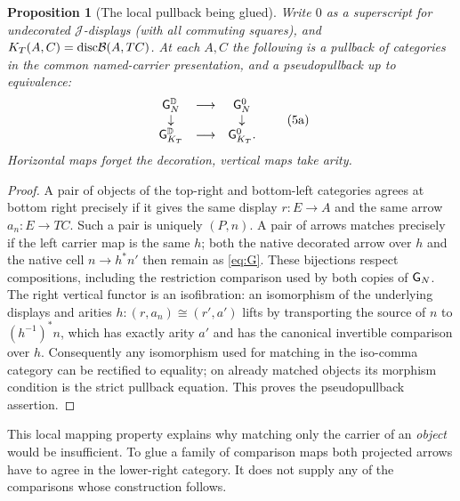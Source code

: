 \documentclass[11pt]{article}
\newtheorem{proposition}[theorem]{Proposition}
\theoremstyle{definition}\newtheorem{definition}[theorem]{Definition}
\newcommand{\B}{\mathcal B}\newcommand{\J}{\mathcal J}
\newcommand{\D}{\mathbb D}\newcommand{\N}{\mathbb N}
\begin{document}
\begin{proposition}[The local pullback being glued]\label{prop:matched}
Write $0$ as a superscript for undecorated $\J$-displays (with all
commuting squares), and $K_T(A,C)=\Disc\B(A,TC)$. At each $A,C$
the following is a pullback of categories in the common named-carrier
presentation, and a pseudopullback up to equivalence:
\[
\begin{array}{ccc}
 \grade_N^{\D}&\longrightarrow&\grade_N^{0}\\
 \downarrow&&\downarrow\\
 \grade_{K_T}^{\D}&\longrightarrow&\grade_{K_T}^{0}.
\end{array}
 \tag{5a}\label{eq:matched}
\]
Horizontal maps forget the decoration, vertical maps take arity.
\end{proposition}
\begin{proof}
A pair of objects of the top-right and bottom-left categories agrees
at bottom right precisely if it gives the same display $r:E\to A$
and the same arrow $a_n:E\to TC$. Such a pair is uniquely $(P,n)$.
A pair of arrows matches precisely if the left carrier map is the
same $h$; both the native decorated arrow over $h$ and the native
cell $n\to h^*n'$ then remain as \eqref{eq:G}. These bijections
respect compositions, including the restriction comparison used by
both copies of $\mathsf G_N$. The right vertical functor is an
isofibration: an isomorphism of the underlying displays and arities
$h:(r,a_n)\cong(r',a')$ lifts by transporting the source of $n$ to
$(h^{-1})^*n$, which has exactly arity $a'$ and has the canonical
invertible comparison over $h$. Consequently any isomorphism used for
matching in the iso-comma category can be rectified to equality;
on already matched objects its morphism condition is the strict
pullback equation. This proves the pseudopullback assertion.
\end{proof}
This local mapping property explains why matching only the carrier of an
\emph{object} would be insufficient. To glue a family of comparison
maps both projected arrows have to agree in the lower-right category.
It does not supply any of the comparisons whose construction follows.
\end{document}
